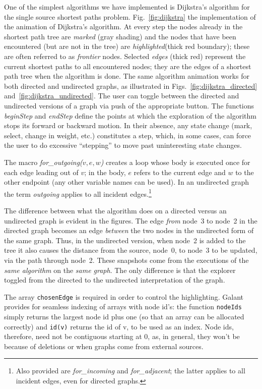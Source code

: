 One of the simplest algorithms we have implemented is Dijkstra's algorithm
for the single source shortest paths problem.
Fig.~\ref{fig:dijkstra}
the implementation of the animation of Dijkstra's algorithm.
At every step the nodes already in the shortest path tree are \emph{marked}
(gray shading) and the nodes that have been encountered (but are not in the tree)
are \emph{highlighted}(thick red boundary); these are often referred to as
\emph{frontier} nodes.
Selected \emph{edges} (thick red) represent the current shortest paths to all
encountered nodes;
they are the edges of a shortest path tree when the algorithm is done.
The same algorithm animation
works for both directed and undirected graphs, as illustrated
in Figs.~\ref{fig:dijkstra_directed} and~\ref{fig:dijkstra_undirected}.
The user can toggle between the directed and undirected versions of a graph
via push of the appropriate button.
The functions \emph{beginStep} and \emph{endStep} define the points at which
the exploration of the algorithm stops its forward or backward motion.
In their absence, any state change (mark, select, change in weight, etc.)
constitutes a step, which, in some cases, can force the user
to do excessive ``stepping'' to move past uninteresting state changes.







The macro \emph{for\_outgoing($v,e,w$)}
creates a loop whose body is executed once
for each edge leading out of $v$; in the body, $e$ refers to the current edge
and $w$ to the other endpoint (any other variable names can be used).
In an undirected graph the term \emph{outgoing} applies to all incident
edges.\footnote{
Also provided are \emph{for\_incoming} and \emph{for\_adjacent};
the latter applies to all incident edges, even for directed graphs.
}

The difference between what the algorithm does on a directed versus an undirected graph is evident in the figures.
The edge \emph{from} node~3 to node~2 in the directed graph becomes an
edge \emph{between} the two nodes in the undirected form of the same graph.
Thus, in the undirected version, when node~2 is added to the tree
it also causes the distance from the source, node~0, to node~3 to be updated,
via the path through node~2.
These snapshots come from the executions of the \emph{same algorithm} on the
\emph{same graph}.
The only difference is that the explorer toggled from the directed to
the undirected
interpretation of the graph.

The array \verb+chosenEdge+ is required in order to control the highlighting.
Galant provides for seamless indexing of arrays with node id's: the
function \verb+nodeIds+ simply returns the largest node id plus one
(so that an array can be allocated correctly) and \verb+id(v)+ returns the
id of v, to be used as an index.
Node ids, therefore, need not be contiguous starting at 0, as,
in general, they won't be because of deletions or when graphs
come from external sources.
